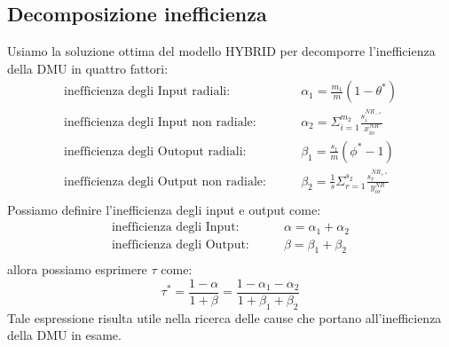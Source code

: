\subsection{Decomposizione inefficienza}
\bigskip
Usiamo la soluzione ottima del modello HYBRID per decomporre l'inefficienza della DMU in quattro fattori:
\begin{equation}
\begin{split}
\text{inefficienza degli Input radiali:} \qquad & \alpha_1 = \frac{m_1}{m}(1 - \theta^*)\\
\text{inefficienza degli Input non radiale:} \qquad & \alpha_2 = \Sigma^{m_2}_{i=1}\frac{s_i^{NR_{-*}}}{x^{NR}_{io}}\\
\text{inefficienza degli Outoput radiali:} \qquad & \beta_1 = \frac{s_1}{m}(\phi^* - 1)\\
\text{inefficienza degli Output non radiale:} \qquad & \beta_2 = \frac{1}{s} \Sigma^{s_2}_{r=1}\frac{s_r^{NR_{+*}}}{y^{NR}_{io}}\\
\end{split}
\end{equation}
Possiamo definire l'inefficienza degli input e output come:
\begin{equation}
\begin{split}
\text{inefficienza degli Input:} \qquad & \alpha = \alpha_1 + \alpha_2 \\
\text{inefficienza degli Output:} \qquad & \beta = \beta_1 + \beta_2 \\
\end{split}
\end{equation}
allora possiamo esprimere $\tau$ come:
\begin{equation}
\tau^* = \frac{1-\alpha}{1 + \beta} = \frac{1 - \alpha_1 - \alpha_2}{1 + \beta_1 + \beta_2}
\end{equation}
Tale espressione risulta utile nella ricerca delle cause che portano all'inefficienza della DMU in esame.

